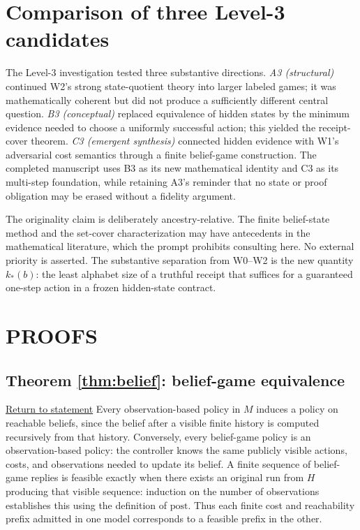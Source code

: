 \documentclass[11pt,letterpaper]{article}
\theoremstyle{definition}
\theoremstyle{remark}
\newcommand{\backstatement}[1]{\hyperlink{stmt:#1}{\footnotesize Return to statement}}
\begin{document}
\section{Comparison of three Level-3 candidates}
The Level-3 investigation tested three substantive directions. \emph{A3 (structural)} continued W2's strong state-quotient theory into larger labeled games; it was mathematically coherent but did not produce a sufficiently different central question. \emph{B3 (conceptual)} replaced equivalence of hidden states by the minimum evidence needed to choose a uniformly successful action; this yielded the receipt-cover theorem. \emph{C3 (emergent synthesis)} connected hidden evidence with W1's adversarial cost semantics through a finite belief-game construction. The completed manuscript uses B3 as its new mathematical identity and C3 as its multi-step foundation, while retaining A3's reminder that no state or proof obligation may be erased without a fidelity argument.

The originality claim is deliberately ancestry-relative. The finite belief-state method and the set-cover characterization may have antecedents in the mathematical literature, which the prompt prohibits consulting here. No external priority is asserted. The substantive separation from W0--W2 is the new quantity $k_*(b)$: the least alphabet size of a truthful receipt that suffices for a guaranteed one-step action in a frozen hidden-state contract.

\section{PROOFS}
\hypertarget{proof:belief}{}\subsection*{Theorem \ref{thm:belief}: belief-game equivalence} \backstatement{belief}
Every observation-based policy in $M$ induces a policy on reachable beliefs, since the belief after a visible finite history is computed recursively from that history. Conversely, every belief-game policy is an observation-based policy: the controller knows the same publicly visible actions, costs, and observations needed to update its belief. A finite sequence of belief-game replies is feasible exactly when there exists an original run from $H$ producing that visible sequence: induction on the number of observations establishes this using the definition of $\mathrm{post}$. Thus each finite cost and reachability prefix admitted in one model corresponds to a feasible prefix in the other.
\end{document}
